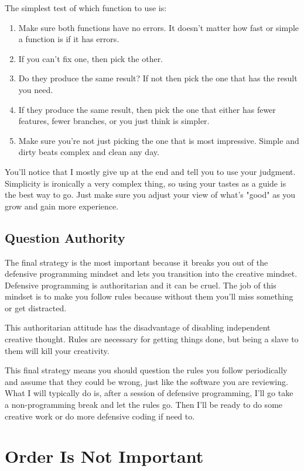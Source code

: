 The simplest test of which function to use is:

\begin{enumerate}
\item Make sure both functions have no errors.  It doesn't matter how fast or
    simple a function is if it has errors.
\item If you can't fix one, then pick the other.
\item Do they produce the same result?  If not then pick the one that has the
    result you need.
\item If they produce the same result, then pick the one that either has
    fewer features, fewer branches, or you just think is simpler.
\item Make sure you're not just picking the one that is most impressive. Simple
    and dirty beats complex and clean any day.
\end{enumerate}

You'll notice that I mostly give up at the end and tell you to use your judgment.
Simplicity is ironically a very complex thing, so using your tastes as a guide
is the best way to go.  Just make sure you adjust your view of what's "good" 
as you grow and gain more experience.


\subsection{Question Authority}

The final strategy is the most important because it breaks you out of the
defensive programming mindset and lets you transition into the creative
mindset.  Defensive programming is authoritarian and it can be cruel.  The
job of this mindset is to make you follow rules because without them you'll
miss something or get distracted.

This authoritarian attitude has the disadvantage of disabling independent 
creative thought.  Rules are necessary for getting things done, but being
a slave to them will kill your creativity.

This final strategy means you should question the rules you follow periodically
and assume that they could be wrong, just like the software you are reviewing.
What I will typically do is, after a session of defensive programming, I'll go
take a non-programming break and let the rules go.  Then I'll be ready to do
some creative work or do more defensive coding if need to.

\section{Order Is Not Important}

